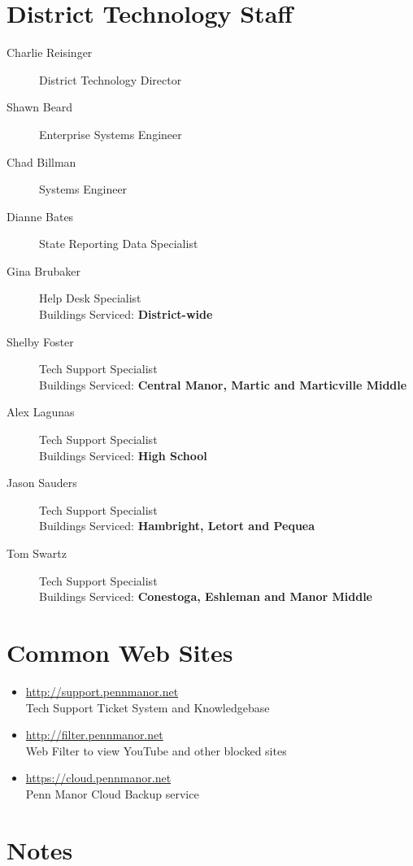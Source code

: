\documentclass[10pt,foldmark,notumble]{leaflet}
\begin{document}
\section{District Technology Staff\color{red}\hrulefill\color{black}}

\begin{description}
	\item[Charlie Reisinger] \dotfill District Technology Director
	\item[Shawn Beard] \dotfill Enterprise Systems Engineer
	\item[Chad Billman] \dotfill Systems Engineer
	\item[Dianne Bates] \dotfill State Reporting Data Specialist
	\item[Gina Brubaker] \dotfill Help Desk Specialist\\{\scriptsize Buildings Serviced: \hfill \textbf{\color{red}District-wide}\color{black}}
	\item[Shelby Foster] \dotfill Tech Support Specialist\\{\scriptsize Buildings Serviced: \hfill \textbf{\color{red}Central Manor, Martic and Marticville Middle}\color{black}}
	\item[Alex Lagunas] \dotfill Tech Support Specialist\\{\scriptsize Buildings Serviced: \hfill \textbf{\color{red}High School}\color{black}}
	\item[Jason Sauders] \dotfill Tech Support Specialist\\{\scriptsize Buildings Serviced: \hfill \textbf{\color{red}Hambright, Letort and Pequea}\color{black}}
	\item[Tom Swartz] \dotfill Tech Support Specialist\\{\scriptsize Buildings Serviced: \hfill \textbf{\color{red}Conestoga, Eshleman and Manor Middle}\color{black}}
\end{description}


\section{Common Web Sites\color{red}\hrulefill\color{black}}
\begin{itemize}
	\item \url{http://support.pennmanor.net}\\Tech Support Ticket System and Knowledgebase
	\item \url{http://filter.pennmanor.net}\\Web Filter to view YouTube and other blocked sites
	\item \url{https://cloud.pennmanor.net}\\Penn Manor Cloud Backup service
\end{itemize}

\section{Notes\color{red}\hrulefill\color{black}}
\end{document}

